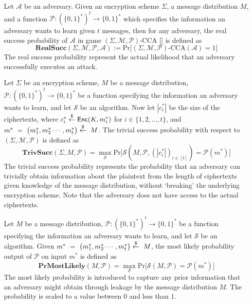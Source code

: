 \begin{definition}
\label{realsucc}
Let $\mathcal{A}$ be an adversary. Given an encryption scheme $\Sigma$, a message distribution $M$, and a function $\mathcal{P}: (\{0,1\}^{*})^{t} \rightarrow \{0,1\}^{*}$ which specifies the information an adversary wants to learn given $t$ messages, then for any adversary, the real success probability of $\mathcal{A}$ in game $(\Sigma,\mathcal{M},\mathcal{P})\text{-CCA}$ [] is defined as
\[ \mathbf{RealSucc}(\Sigma,\mathcal{M},\mathcal{P},\mathcal{A}) := \text{Pr}\big[(\Sigma,\mathcal{M},\mathcal{P})\text{-CCA}(\mathcal{A}) = 1 \big]  \]
The real success probability represent the actual likelihood that an adversary successfully executes an attack.
\end{definition}

\begin{definition}
\label{trivsucc}
Let $\Sigma$ be an encryption scheme, $M$ be a message distribution, $\mathcal{P}: (\{0,1\}^{*})^{t} \rightarrow \{0,1\}^{*}$ be a function specifying the information an adversary wants to learn, and let $\mathcal{S}$ be an algorithm. Now let $|c^{*}_{i}|$ be the size of the ciphertexts, where $c^{*}_{i} \overset{\$}{\leftarrow} \mathsf{Enc}(K, m^{*}_{i})$ for $i \in \{1,2,...,t\}$, and $m^{*}~=~\big( m_{1}^{*}, m_{2}^{*}\cdots , m_{t}^{*} \big) \overset{\$}{\leftarrow}~M$. The trivial success probability with respect to $(\Sigma,\mathcal{M},\mathcal{P})$ is defined as
\[ \mathbf{TrivSucc}(\Sigma,M,\mathcal{P}) = \mathop{max}_{\mathcal{S}} \text{Pr}\big[ \mathcal{S}(M, \mathcal{P},(|c_{i}^{*}|)_{i \in [t]}) = \mathcal{P}(m^{*})\big] \]
The trivial success probability represents the probability that an adversary can trivially obtain information about the plaintext from the length of ciphertexts given knowledge of the message distribution, without `breaking' the underlying encryption scheme. Note that the adversary does not have access to the actual ciphertexts.
\end{definition}

\begin{definition}
\label{mostlikely}
Let $M$ be a message distribution, $\mathcal{P}: (\{0,1\}^{*})^{t} \rightarrow \{0,1\}^{*}$ be a function specifying the information an adversary wants to learn, and let $\mathcal{S}$ be an algorithm. Given $m^{*}~=~\big( m_{1}^{*}, m_{2}^{*}\cdots , m_{t}^{*} \big) \overset{\$}{\leftarrow}~M$, the most likely probability output of $\mathcal{P}$ on input $m^{*}$ is defined as
\[ \mathbf{PrMostLikely}(M,\mathcal{P}) = \mathop{max}_{\mathcal{S}} \text{Pr}\big[ \mathcal{S}(M, \mathcal{P}) = \mathcal{P}(m^{*})\big] \]
The most likely probability is introduced to capture any prior information that an adversary might obtain through leakage by the message distribution $M$. The probability is scaled to a value between $0$ and less than $1$.
\end{definition}

